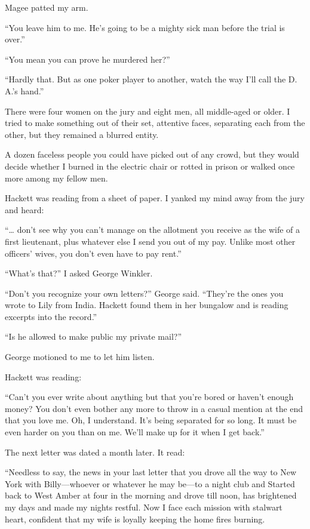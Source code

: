 \documentclass{novel}
\begin{document}
Magee patted my arm. 

“You leave him to me. He’s going to be a mighty sick man before the trial is over.”

“You mean you can prove he murdered her?”

“Hardly that. But as one poker player to another, watch the way I’ll call the D. A.’s hand.”

\scenestars

There were four women on the jury and eight men, all middle-aged or older. I tried to make something out of their set, attentive faces, separating each from the other, but they remained a blurred entity.

A dozen faceless people you could have picked out of any crowd, but they would decide whether I burned in the electric chair or rotted in prison or walked once more among my fellow men.

Hackett was reading from a sheet of paper. I yanked my mind away from the jury and heard:

“… don’t see why you can’t manage on the allotment you receive as the wife of a first lieutenant, plus whatever else I send you out of my pay. Unlike most other officers’ wives, you don’t even have to pay rent.”

“What’s that?” I asked George Winkler.

“Don’t you recognize your own letters?” George said. “They’re the ones you wrote to Lily from India. Hackett found them in her bungalow and is reading excerpts into the record.”

“Is he allowed to make public my private mail?”

George motioned to me to let him listen.

Hackett was reading:

“Can’t you ever write about anything but that you’re bored or haven’t enough money? You don’t even bother any more to throw in a casual mention at the end that you love me. Oh, I understand. It’s being separated for so long. It must be even harder on you than on me. We’ll make up for it when I get back.”

The next letter was dated a month later. It read:

“Needless to say, the news in your last letter that you drove all the way to New York with Billy—whoever or whatever he may be—to a night club and Started back to West Amber at four in the morning and drove till noon, has brightened my days and made my nights restful. Now I face each mission with stalwart heart, confident that my wife is loyally keeping the home fires burning.
\end{document}
